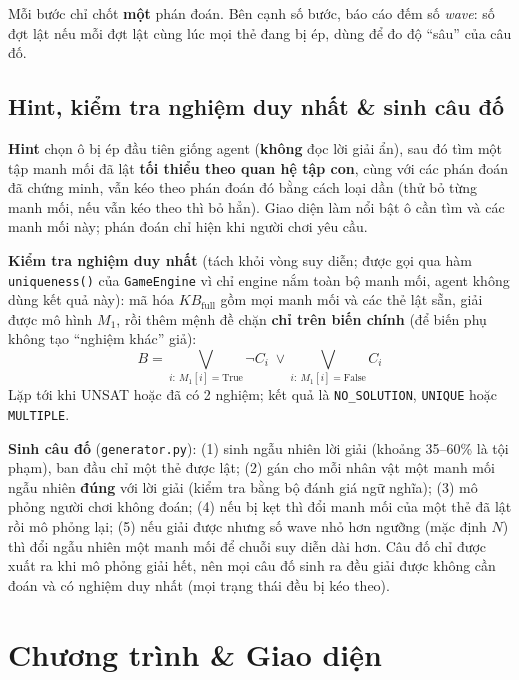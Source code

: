 \documentclass{article}
\newcommand{\code}[1]{\texttt{#1}}
\newcommand{\KB}{\mathit{KB}}
\begin{document}
Mỗi bước chỉ chốt \textbf{một} phán đoán. Bên cạnh số bước, báo cáo đếm số \textit{wave}: số đợt lật nếu mỗi đợt lật cùng lúc mọi thẻ đang bị ép, dùng để đo độ ``sâu'' của câu đố.

\subsection{Hint, kiểm tra nghiệm duy nhất \& sinh câu đố}
\textbf{Hint} chọn ô bị ép đầu tiên giống agent (\textbf{không} đọc lời giải ẩn), sau đó tìm một tập manh mối đã lật \textbf{tối thiểu theo quan hệ tập con}, cùng với các phán đoán đã chứng minh, vẫn kéo theo phán đoán đó bằng cách loại dần (thử bỏ từng manh mối, nếu vẫn kéo theo thì bỏ hẳn). Giao diện làm nổi bật ô cần tìm và các manh mối này; phán đoán chỉ hiện khi người chơi yêu cầu.

\textbf{Kiểm tra nghiệm duy nhất} (tách khỏi vòng suy diễn; được gọi qua hàm \code{uniqueness()} của \code{GameEngine} vì chỉ engine nắm toàn bộ manh mối, agent không dùng kết quả này): mã hóa $\KB_{\text{full}}$ gồm mọi manh mối và các thẻ lật sẵn, giải được mô hình $M_1$, rồi thêm mệnh đề chặn \textbf{chỉ trên biến chính} (để biến phụ không tạo ``nghiệm khác'' giả):
\begin{equation}
B = \bigvee_{i:\ M_1[i] = \text{True}} \neg C_i \;\lor \bigvee_{i:\ M_1[i] = \text{False}} C_i
\end{equation}
Lặp tới khi UNSAT hoặc đã có 2 nghiệm; kết quả là \code{NO\_SOLUTION}, \code{UNIQUE} hoặc \code{MULTIPLE}.

\textbf{Sinh câu đố} (\code{generator.py}): (1) sinh ngẫu nhiên lời giải (khoảng 35--60\% là tội phạm), ban đầu chỉ một thẻ được lật; (2) gán cho mỗi nhân vật một manh mối ngẫu nhiên \textbf{đúng} với lời giải (kiểm tra bằng bộ đánh giá ngữ nghĩa); (3) mô phỏng người chơi không đoán; (4) nếu bị kẹt thì đổi manh mối của một thẻ đã lật rồi mô phỏng lại; (5) nếu giải được nhưng số wave nhỏ hơn ngưỡng (mặc định $N$) thì đổi ngẫu nhiên một manh mối để chuỗi suy diễn dài hơn. Câu đố chỉ được xuất ra khi mô phỏng giải hết, nên mọi câu đố sinh ra đều giải được không cần đoán và có nghiệm duy nhất (mọi trạng thái đều bị kéo theo).

\section{Chương trình \& Giao diện}
\end{document}
